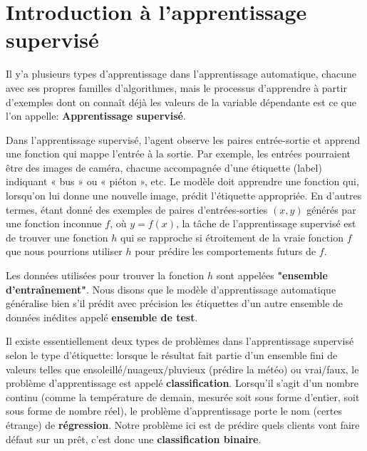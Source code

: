 \section{Introduction à l’apprentissage supervisé}
\label{chap4.section1}
Il y'a plusieurs types d'apprentissage dans l'apprentissage automatique, chacune avec ses propres familles d'algorithmes, mais le processus d'apprendre à partir d'exemples dont on connaît déjà les valeurs de la variable dépendante est ce que l'on appelle: \textbf{Apprentissage supervisé}.

Dans l'apprentissage supervisé, l'agent observe les paires entrée-sortie et apprend une fonction qui mappe l'entrée à la sortie. Par exemple, les entrées pourraient être des images de caméra, chacune accompagnée d'une étiquette (label) indiquant « bus » ou « piéton », etc. Le modèle doit apprendre une fonction qui, lorsqu'on lui donne une nouvelle image, prédit l'étiquette appropriée. En d'autres termes, étant donné des exemples de paires d'entrées-sorties \((x, y)\) générés par une fonction inconnue \(f\), où \(y = f(x)\), la tâche de l'apprentissage supervisé est de trouver une fonction \(h\) qui se rapproche si étroitement de la vraie fonction \(f\) que nous pourrions utiliser \(h\) pour prédire les comportements futurs de \(f\).

Les données utilisées pour trouver la fonction \(h\) sont appelées \textbf{"ensemble d’entraînement"}. Nous disons que le modèle d'apprentissage automatique généralise bien s'il prédit avec précision les étiquettes d'un autre ensemble de données inédites appelé \textbf{ensemble de test}.

Il existe essentiellement deux types de problèmes dans l'apprentissage supervisé selon le type d'étiquette: lorsque le résultat fait partie d'un ensemble fini de valeurs telles que ensoleillé/nuageux/pluvieux (prédire la météo) ou vrai/faux, le problème d'apprentissage est appelé \textbf{classification}. Lorsqu’il s’agit d’un nombre continu (comme la température de demain, mesurée soit sous forme d’entier, soit sous forme de nombre réel), le problème d’apprentissage porte le nom (certes étrange) de \textbf{régression}. Notre problème ici est de prédire quels clients vont faire défaut sur un prêt, c'est donc une \textbf{classification binaire}. 

